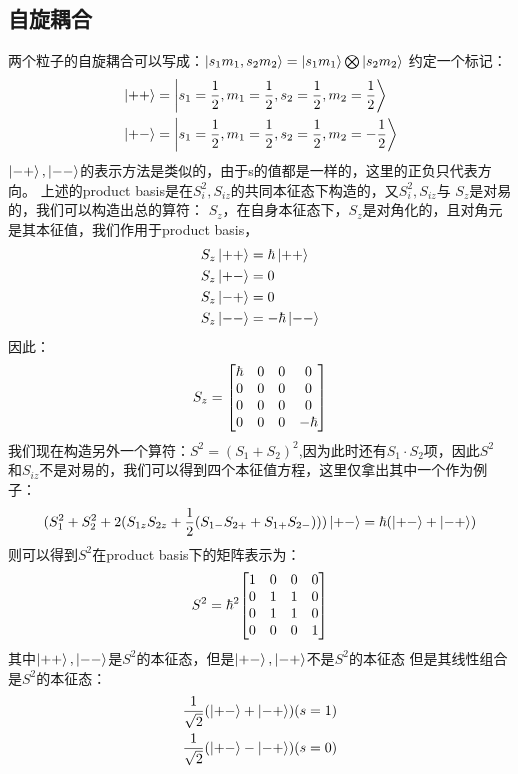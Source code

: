 \documentclass[UTF8]{article}
\numberwithin{equation}{section}
\begin{document}
\subsection{自旋耦合}
两个粒子的自旋耦合可以写成：$\ket{s_1m_1,s_2m_2}=\ket{s_1m_1}\bigotimes\ket{s_2m_2}$
约定一个标记：
\begin{align*}
     & \ket{++}=\ket{s_1=\frac{1}{2},m_1=\frac{1}{2},s_2=\frac{1}{2},m_2=\frac{1}{2}}  \\
     & \ket{+-}=\ket{s_1=\frac{1}{2},m_1=\frac{1}{2},s_2=\frac{1}{2},m_2=-\frac{1}{2}}
\end{align*}
$\ket{-+},\ket{--}$的表示方法是类似的，由于s的值都是一样的，这里的正负只代表方向。
上述的product basis是在$S_i^2,S_{iz}$的共同本征态下构造的，又$S_i^2,S_{iz}$与
$S_z$是对易的，我们可以构造出总的算符：
$S_z$，在自身本征态下，$S_z$是对角化的，且对角元是其本征值，我们作用于product basis，
\begin{align*}
     & S_z\ket{++}=\hbar \ket{++} \\
     & S_z\ket{+-}=0              \\
     & S_z\ket{-+}=0              \\
     & S_z\ket{--}=-\hbar\ket{--}
\end{align*}
因此：
\begin{align*}
    S_z=\mqty[\hbar & 0 & 0 & 0 \\0&0&0&0\\0&0&0&0\\0&0&0&-\hbar]
\end{align*}
我们现在构造另外一个算符：$S^2=(S_1+S_2)^2$,因为此时还有$S_1\cdot S_2$项，因此$S^2$
和$S_{iz}$不是对易的，我们可以得到四个本征值方程，这里仅拿出其中一个作为例子：
\begin{align*}
    (S_{1}^2+S_{2}^2+2(S_{1z}S_{2z}+\frac{1}{2}(S_{1-}S_{2+}+S_{1+}S_{2-})))\ket{+-}=\hbar(\ket{+-}+\ket{-+})
\end{align*}
则可以得到$S^2$在product basis下的矩阵表示为：
\begin{align*}
    S^2= \hbar^2\mqty[1 & 0 & 0 & 0 \\0&1&1&0\\0&1&1&0\\0&0&0&1]
\end{align*}
其中$\ket{++},\ket{--}$是$S^2$的本征态，但是$\ket{+-},\ket{-+}$不是$S^2$的本征态
但是其线性组合是$S^2$的本征态：
\begin{align*}
    \frac{1}{\sqrt{2}}(\ket{+-}+\ket{-+})(s=1) \\
    \frac{1}{\sqrt{2}}(\ket{+-}-\ket{-+})(s=0)
\end{align*}
\end{document}
